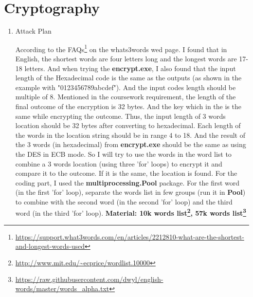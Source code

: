 \documentclass[margin 2cm]{report}
\begin{document}
\newpage
\Large\section[2]{Cryptography}

\begin{enumerate}
\normalsize\item[1)]{Attack Plan}
\begin{spacing}{1.5}
\newline\normalsize\indent\setlength{\parindent}{2em}According to the FAQs\footnote[1]{\url{https://support.what3words.com/en/articles/2212810-what-are-the-shortest-and-longest-words-used}} on the whats3words wed page. I found that in English, the shortest words are four letters long and the longest words are 17-18 letters. And when trying the \textbf{encrypt.exe}, I also found that the input length of the Hexadecimal code is the same as the outputs (as shown in the example with "0123456789abcdef"). And the input codes length should be multiple of 8. \newline Mentioned in the coursework requirement, the length of the final outcome of the encryption is 32 bytes. And the key which in the  is the same while encrypting the outcome. \newline Thus, the input length of 3 words location should be 32 bytes after converting to hexadecimal. Each length of the words in the location string should be in range 4 to 18. And the result of the 3 words (in hexadecimal) from \textbf{encrypt.exe} should be the same as using the DES in ECB mode. So I will try to use the words in the word list to combine a 3 words location (using three 'for' loops) to encrypt it and compare it to the outcome. If it is the same, the location is found. For the coding part, I used the \textbf{multiprocessing.Pool} package. For the first word (in the first 'for' loop), separate the words list in few groups (run it in \textbf{Pool}) to combine with the second word (in the second 'for' loop)  and the third word (in the third 'for' loop). \newline\textbf{Material: 10k words list\footnote[2]{\url{http://www.mit.edu/~ecprice/wordlist.10000}}, 57k words list\footnote[3]{\url{https://raw.githubusercontent.com/dwyl/english-words/master/words_alpha.txt}}}
\end{spacing}



\end{enumerate}
\end{document}
